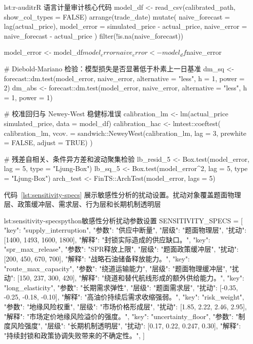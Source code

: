 \begin{paperlisting}{lst:r-audit}{r}{R 语言计量审计核心代码}
model_df <- read_csv(calibrated_path, show_col_types = FALSE) %
  arrange(trade_date) %
  mutate(
    naive_forecast = lag(actual_price),
    model_error = simulated_price - actual_price,
    naive_error = naive_forecast - actual_price
  ) %
  filter(!is.na(naive_forecast))

model_error <- model_df$model_error
naive_error <- model_df$naive_error

# Diebold-Mariano 检验：模型损失是否显著低于朴素上一日基准
dm_sq <- forecast::dm.test(model_error, naive_error,
                           alternative = "less", h = 1, power = 2)
dm_abs <- forecast::dm.test(model_error, naive_error,
                            alternative = "less", h = 1, power = 1)

# 校准回归与 Newey-West 稳健标准误
calibration_lm <- lm(actual_price ~ simulated_price, data = model_df)
calibration_hac <- lmtest::coeftest(
  calibration_lm,
  vcov. = sandwich::NeweyWest(calibration_lm, lag = 3,
                              prewhite = FALSE, adjust = TRUE)
)

# 残差自相关、条件异方差和波动聚集检验
lb_resid_5 <- Box.test(model_error, lag = 5, type = "Ljung-Box")
lb_sq_5 <- Box.test(model_error^2, lag = 5, type = "Ljung-Box")
arch_test <- FinTS::ArchTest(model_error, lags = 5)
\end{paperlisting}

代码~\ref{lst:sensitivity-specs} 展示敏感性分析的扰动设置。扰动对象覆盖题面物理层、政策缓冲层、需求层、行为层和长期机制透明层

\begin{paperlisting}{lst:sensitivity-specs}{python}{敏感性分析扰动参数设置}
SENSITIVITY_SPECS = [
    {"key": "supply_interruption", "参数": "供应中断量",
     "层级": "题面物理层", "扰动": [1400, 1493, 1600, 1800],
     "解释": "封锁实际造成的供应缺口。"},
    {"key": "spr_max_release", "参数": "SPR释放上限",
     "层级": "题面政策缓冲层", "扰动": [200, 450, 670, 700],
     "解释": "战略石油储备释放能力。"},
    {"key": "route_max_capacity", "参数": "绕道运输能力",
     "层级": "题面物理缓冲层", "扰动": [150, 237, 300, 420],
     "解释": "绕道和替代航线形成的额外供给能力。"},
    {"key": "long_elasticity", "参数": "长期需求弹性",
     "层级": "题面需求层", "扰动": [-0.35, -0.25, -0.18, -0.10],
     "解释": "高油价持续后需求收缩强弱。"},
    {"key": "risk_weight", "参数": "地缘风险权重",
     "层级": "市场价格形成层", "扰动": [1.85, 2.22, 2.46, 2.95],
     "解释": "市场定价地缘风险溢价的强度。"},
    {"key": "uncertainty_floor", "参数": "制度风险强度",
     "层级": "长期机制透明层", "扰动": [0.17, 0.22, 0.247, 0.30],
     "解释": "持续封锁和政策协调失败带来的不确定性。"},
]
\end{paperlisting}

